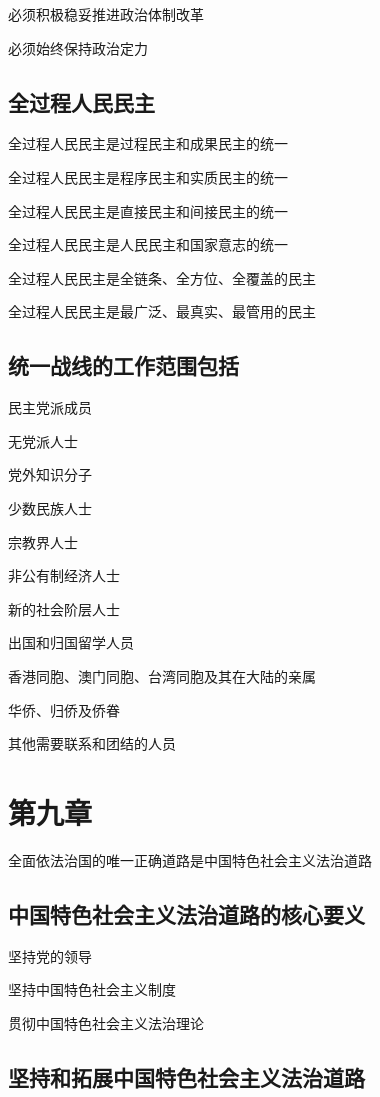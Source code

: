 \documentclass[11pt, a4paper]{article}
\begin{document}
必须积极稳妥推进政治体制改革

必须始终保持政治定力

\subsection*{全过程人民民主}

全过程人民民主是过程民主和成果民主的统一

全过程人民民主是程序民主和实质民主的统一

全过程人民民主是直接民主和间接民主的统一

全过程人民民主是人民民主和国家意志的统一

全过程人民民主是全链条、全方位、全覆盖的民主

全过程人民民主是最广泛、最真实、最管用的民主

\subsection*{统一战线的工作范围包括}

民主党派成员

无党派人士

党外知识分子

少数民族人士

宗教界人士

非公有制经济人士

新的社会阶层人士

出国和归国留学人员

香港同胞、澳门同胞、台湾同胞及其在大陆的亲属

华侨、归侨及侨眷

其他需要联系和团结的人员

\section*{第九章}

全面依法治国的唯一正确道路是中国特色社会主义法治道路

\subsection*{中国特色社会主义法治道路的核心要义}

坚持党的领导

坚持中国特色社会主义制度

贯彻中国特色社会主义法治理论

\subsection*{坚持和拓展中国特色社会主义法治道路}
\end{document}
